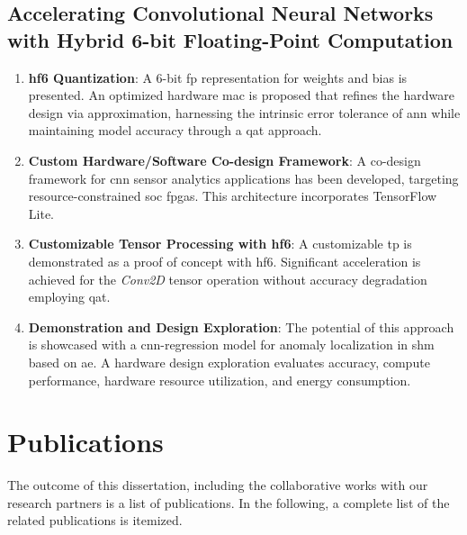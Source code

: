 \subsection{Accelerating Convolutional Neural Networks with Hybrid 6-bit Floating-Point Computation}
\begin{enumerate}
	\item \textbf{\gls{hf6} Quantization}: 
	A 6-bit \gls{fp} representation for weights and bias is presented. An optimized hardware \gls{mac} is proposed that refines the hardware design via approximation, harnessing the intrinsic error tolerance of \gls{ann} while maintaining model accuracy through a \gls{qat} approach. 
	
	\item \textbf{Custom Hardware/Software Co-design Framework}: 
	A co-design framework for \gls{cnn} sensor analytics applications has been developed, targeting resource-constrained \gls{soc} \glspl{fpga}. This architecture incorporates TensorFlow Lite.
	
	\item \textbf{Customizable Tensor Processing with \gls{hf6}}: 
	A customizable \gls{tp} is demonstrated as a proof of concept with \gls{hf6}. Significant acceleration is achieved for the \emph{Conv2D} tensor operation without accuracy degradation employing \gls{qat}.
	
	\item \textbf{Demonstration and Design Exploration}: 
	The potential of this approach is showcased with a \gls{cnn}-regression model for anomaly localization in \gls{shm} based on \gls{ae}. A hardware design exploration evaluates accuracy, compute performance, hardware resource utilization, and energy consumption.
\end{enumerate}


\section{Publications}
The outcome of this dissertation, including the collaborative works with our research partners is a list of publications. In the following, a complete list of the related publications is itemized.

